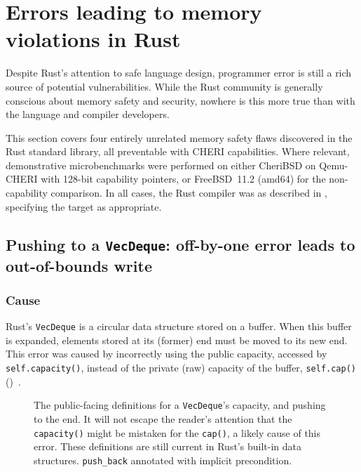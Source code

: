 \documentclass[dissertation.tex]{subfiles}
\begin{document}
\section{Errors leading to memory violations in Rust}
\label{sec:eval-bugs}

Despite Rust's attention to safe language design, programmer error is
still a rich source of potential vulnerabilities.
While the Rust community is generally conscious about memory safety and
security, nowhere is this more true than with the language and compiler
developers.

This section covers four entirely unrelated memory safety flaws
discovered in the Rust standard library, all preventable with CHERI
capabilities.
Where relevant, demonstrative microbenchmarks were performed on either
CheriBSD on Qemu-CHERI with 128-bit capability pointers, or FreeBSD~11.2
(amd64) for the non-capability comparison.
In all cases, the Rust compiler was as described in
, specifying the target as appropriate.


\subsection{Pushing to a \texttt{VecDeque}: off-by-one error leads to out-of-bounds write}
\label{sec:eval-micro-push}

\subsubsection{Cause}
Rust's \texttt{VecDeque} is a circular data structure stored on a
buffer.
When this buffer is expanded, elements stored at its (former) end must
be moved to its new end.
This error was caused by incorrectly using the public capacity, accessed
by \texttt{self.capacity()}, instead of the private (raw) capacity of
the buffer, \texttt{self.cap()}
()~\cite{rust-pr-reserve,rust-issue-deque-append}.

\begin{figure}[ht]
    
    \caption{
        The public-facing definitions for a \texttt{VecDeque}'s
        capacity, and pushing to the end.
        It will not escape the reader's attention that the
        \texttt{capacity()} might be mistaken for the \texttt{cap()}, a
        likely cause of this error.
        These definitions are still current in Rust's built-in data
        structures.
        \texttt{push\_back} annotated with implicit precondition.
    }
    \label{lst:deque-defs}
\end{figure}
\end{document}

